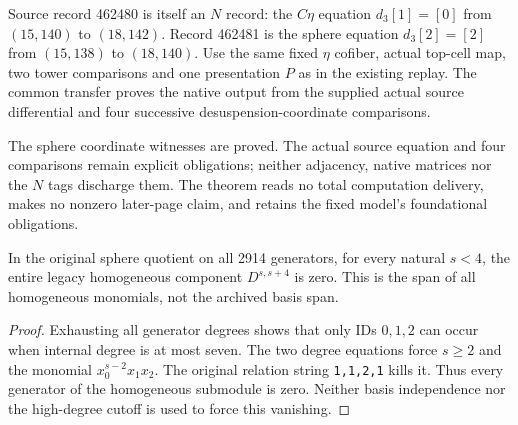 \begin{proposition}
  \label{prop:lin-native-naturality-462481}
  \notready
  Source record 462480 is itself an $N$ record: the $C\eta$ equation
  $d_3[1]=[0]$ from $(15,140)$ to $(18,142)$.
  Record 462481 is the sphere equation $d_3[2]=[2]$ from $(15,138)$
  to $(18,140)$. Use the same fixed $\eta$ cofiber, actual top-cell map,
  two tower comparisons and one presentation $P$ as in the existing replay.
  The common transfer proves the native output from the supplied actual
  source differential and four successive desuspension-coordinate comparisons.

  The sphere coordinate witnesses are proved. The actual source equation
  and four comparisons remain explicit obligations; neither adjacency,
  native matrices nor the $N$ tags discharge them. The theorem reads no
  total computation delivery, makes no nonzero later-page claim, and
  retains the fixed model's foundational obligations.
\end{proposition}

\begin{lemma}
  \label{lem:lin-stem-four-low}
  \leanok
  In the original sphere quotient on all 2914 generators, for every
  natural $s<4$, the entire legacy homogeneous component $D^{s,s+4}$ is zero.
  This is the span of all homogeneous monomials, not the archived basis span.
\end{lemma}
\begin{proof}
  \leanok
  Exhausting all generator degrees shows that only IDs $0,1,2$ can
  occur when internal degree is at most seven. The two degree equations
  force $s\ge2$ and the monomial $x_0^{s-2}x_1x_2$.
  The original relation string \texttt{1,1,2,1} kills it. Thus every
  generator of the homogeneous submodule is zero. Neither basis
  independence nor the high-degree cutoff is used to force this vanishing.
\end{proof}

